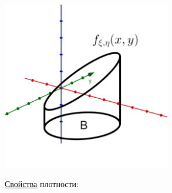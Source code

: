 \documentclass[12pt]{article}
\begin{document}
    \begin{center}
        \includegraphics[width=0.55\textwidth]{probtheory/images/probtheory_2024_11_19_2}
    \end{center}


    \underline{Свойства} плотности:
\end{document}
